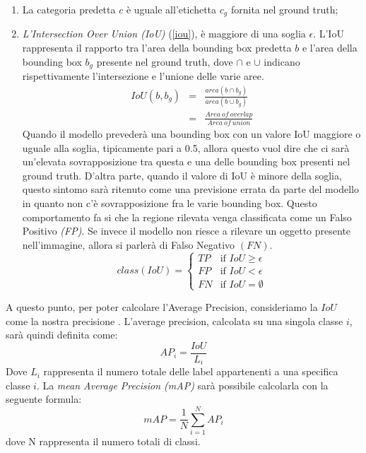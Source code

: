 \begin{enumerate}
    \item La categoria predetta $c$ è uguale all’etichetta $c_g$ fornita nel ground truth;
    \item \emph{L'Intersection Over Union (IoU)} (\ref{iou}), è maggiore di una soglia $\epsilon$. L'IoU 
    rappresenta il rapporto tra l'area della bounding box predetta $b$ e l'area 
    della bounding box $b_g$ presente nel ground truth, dove $\cap$ e $\cup$ indicano 
    rispettivamente l’intersezione e l’unione delle varie aree.
    \begin{eqnarray}\label{iou}
        IoU(b,b_g) & = & \frac{area(b \cap b_g)}{area(b \cup b_g)} \nonumber \\
                 & = & \frac{Area \ of \ overlap}{Area \ of \ union}
    \end{eqnarray}
    Quando il modello prevederà una bounding box con un valore IoU maggiore 
    o uguale alla soglia,  tipicamente pari a 0.5, allora questo vuol dire che ci 
    sarà un’elevata sovrapposizione tra questa e una delle bounding box presenti 
    nel ground truth. D’altra parte, quando il valore di IoU è minore della 
    soglia, questo sintomo sarà ritenuto come una previsione errata da parte 
    del modello in quanto non c’è sovrapposizione fra le varie bounding box. 
    Questo comportamento fa si che la regione rilevata venga classificata come 
    un Falso Positivo \emph{(FP)}. Se invece il modello non riesce a rilevare un oggetto 
    presente nell’immagine, allora si parlerà di Falso Negativo $(FN)$.
    \begin{equation}\label{iou values}
        class(IoU) = \left\{
            \begin{array}{rl}
            TP & \mbox{if } IoU \geq \epsilon \\
            FP & \mbox{if } IoU < \epsilon \\
            FN & \mbox{if } IoU = \emptyset
            \end{array}
            \right.
    \end{equation}
\end{enumerate}
A questo punto, per poter calcolare l’Average Precision, consideriamo la $IoU$ come 
la nostra precisione \cite{rosebrock2017deep}. L’average precision, calcolata su una singola classe $i$, sarà 
quindi definita come:
\begin{equation}\label{average precision}
    AP_i = \frac{IoU}{L_i}
\end{equation}
Dove $L_i$ rappresenta il numero totale delle label appartenenti a una specifica 
classe $i$. La \emph{mean Average Precision (mAP)} sarà possibile calcolarla con la seguente formula:
\begin{equation}\label{mean average precision}
    mAP = \frac{1}{N}\sum_{i=1}^NAP_i
\end{equation}
dove N rappresenta il numero totali di classi.







